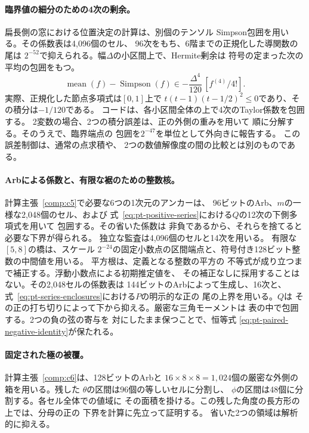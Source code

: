 \paragraph{臨界値の細分のための4次の剰余。}
扁長側の窓における位置決定の計算は、別個のテンソル
Simpson包囲を用いる。その係数表は4,096個のセル、
96次をもち、6階までの正規化した導関数の尾は
$2^{-52}$で抑えられる。幅$\Delta$の小区間上で、Hermite剰余は
符号の定まった次の平均の包囲をもつ。
\[
 \operatorname{mean}(f)-\operatorname{Simpson}(f)
 \in -\frac{\Delta^4}{120}\,[f^{(4)}/4!].
\]
実際、正規化した節点多項式は$[0,1]$上で
$t(t-1)(t-1/2)^2\leq0$であり、その積分は$-1/120$である。
コードは、各小区間全体の上で4次のTaylor係数を包囲する。
2変数の場合、2つの積分誤差は、正の外側の重みを用いて
順に分解する。そのうえで、臨界端点の
包囲を$2^{-47}$を単位として外向きに報告する。
この誤差制御は、通常の点求積や、
2つの数値解像度の間の比較とは別のものである。

\paragraph{Arbによる係数と、有限な裾のための整数核。}
計算主張~\ref{comp:c5}で必要な6つの1次元のアンカーは、
96ビットのArb、$m$の一様な2,048個のセル、および
式~\eqref{eq:pt-positive-series}における$Q$の12次の下側多項式を用いて
包囲する。その省いた係数は
非負であるから、それらを捨てると必要な下界が得られる。
独立な監査は4,096個のセルと14次を用いる。
有限な$[5,8]$の橋は、スケール
$2^{-24}$の固定小数点の区間端点と、符号付き128ビット整数の中間値を用いる。
平方根は、定義となる整数の平方の
不等式が成り立つまで補正する。浮動小数点による初期推定値を、
その補正なしに採用することはない。その2,048セルの係数表は
144ビットのArbによって生成し、16次と、式~\eqref{eq:pt-series-enclosures}における$P$の明示的な正の
尾の上界を用いる。$Q$は
その正の打ち切りによって下から抑える。厳密な三角モーメントは
表の中で包囲する。2つの負の弦の寄与を
対にしたまま保つことで、恒等式
\eqref{eq:pt-paired-negative-identity}が保たれる。

\paragraph{固定された極の被覆。}
計算主張~\ref{comp:c6}は、128ビットのArbと
$16\times8\times8=1,024$個の厳密な外側の箱を用いる。残した
$\theta$の区間は96個の等しいセルに分割し、
$\phi$の区間は48個に分割する。各セル全体での値域に
その面積を掛ける。この残した角度の長方形の上では、分母の正の
下界を計算に先立って証明する。
省いた2つの領域は解析的に抑える。


